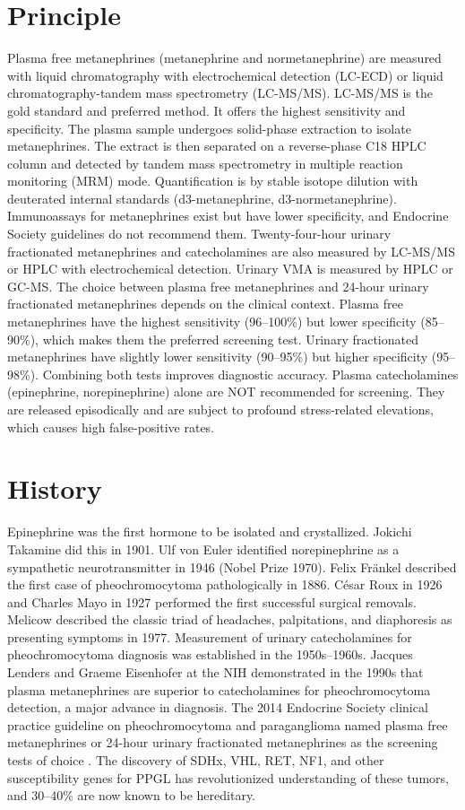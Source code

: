 \section*{Principle}
Plasma free metanephrines (metanephrine and normetanephrine) are measured with liquid chromatography with electrochemical detection (LC-ECD) or liquid chromatography-tandem mass spectrometry (LC-MS/MS). LC-MS/MS is the gold standard and preferred method. It offers the highest sensitivity and specificity. The plasma sample undergoes solid-phase extraction to isolate metanephrines. The extract is then separated on a reverse-phase C18 HPLC column and detected by tandem mass spectrometry in multiple reaction monitoring (MRM) mode. Quantification is by stable isotope dilution with deuterated internal standards (d3-metanephrine, d3-normetanephrine). Immunoassays for metanephrines exist but have lower specificity, and Endocrine Society guidelines do not recommend them. Twenty-four-hour urinary fractionated metanephrines and catecholamines are also measured by LC-MS/MS or HPLC with electrochemical detection. Urinary VMA is measured by HPLC or GC-MS. The choice between plasma free metanephrines and 24-hour urinary fractionated metanephrines depends on the clinical context. Plasma free metanephrines have the highest sensitivity (96--100\%) but lower specificity (85--90\%), which makes them the preferred screening test. Urinary fractionated metanephrines have slightly lower sensitivity (90--95\%) but higher specificity (95--98\%). Combining both tests improves diagnostic accuracy. Plasma catecholamines (epinephrine, norepinephrine) alone are NOT recommended for screening. They are released episodically and are subject to profound stress-related elevations, which causes high false-positive rates.

\section*{History}
Epinephrine was the first hormone to be isolated and crystallized. Jokichi Takamine did this in 1901. Ulf von Euler identified norepinephrine as a sympathetic neurotransmitter in 1946 (Nobel Prize 1970). Felix Fränkel described the first case of pheochromocytoma pathologically in 1886. César Roux in 1926 and Charles Mayo in 1927 performed the first successful surgical removals. Melicow described the classic triad of headaches, palpitations, and diaphoresis as presenting symptoms in 1977. Measurement of urinary catecholamines for pheochromocytoma diagnosis was established in the 1950s--1960s. Jacques Lenders and Graeme Eisenhofer at the NIH demonstrated in the 1990s that plasma metanephrines are superior to catecholamines for pheochromocytoma detection, a major advance in diagnosis. The 2014 Endocrine Society clinical practice guideline on pheochromocytoma and paraganglioma named plasma free metanephrines or 24-hour urinary fractionated metanephrines as the screening tests of choice \cite{lenders2014}. The discovery of SDHx, VHL, RET, NF1, and other susceptibility genes for PPGL has revolutionized understanding of these tumors, and 30--40\% are now known to be hereditary.

